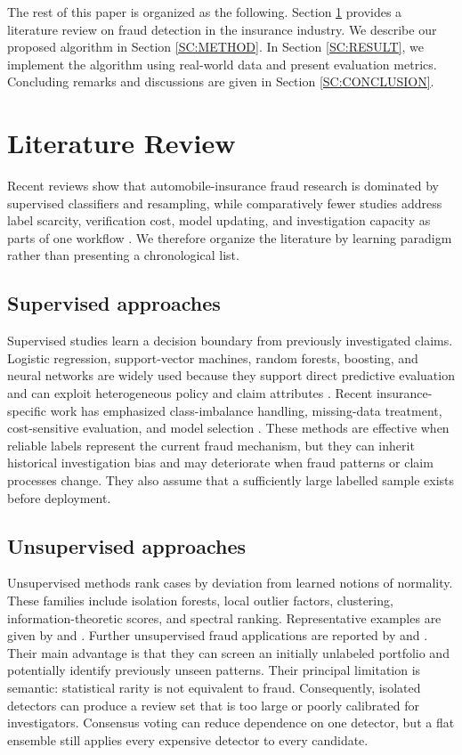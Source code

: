 \documentclass[12pt]{article}
\begin{document}
The rest of this paper is organized as the following. Section
\ref{SC:LR} provides a literature review on fraud detection in the
insurance industry. We describe our proposed algorithm in Section
\ref{SC:METHOD}. In Section \ref{SC:RESULT}, we implement the
algorithm using real-world data and present evaluation metrics.
Concluding remarks and discussions are given in Section
\ref{SC:CONCLUSION}.


\section{Literature Review}\label{SC:LR}

Recent reviews show that automobile-insurance fraud research is dominated by
supervised classifiers and resampling, while comparatively fewer studies
address label scarcity, verification cost, model updating, and investigation
capacity as parts of one workflow \cite{A61,Schrijver2024}. We therefore
organize the literature by learning paradigm rather than presenting a
chronological list.

\subsection{Supervised approaches}
Supervised studies learn a decision boundary from previously investigated
claims. Logistic regression, support-vector machines, random forests, boosting,
and neural networks are widely used because they support direct predictive
evaluation and can exploit heterogeneous policy and claim attributes
\cite{A41,A80}. Recent insurance-specific work has emphasized class-imbalance
handling, missing-data treatment, cost-sensitive evaluation, and model
selection \cite{BanulescuRadu2024,Khalil2024,Ding2025}. These methods are
effective when reliable labels represent the current fraud mechanism, but they
can inherit historical investigation bias and may deteriorate when fraud
patterns or claim processes change. They also assume that a sufficiently large
labelled sample exists before deployment.

\subsection{Unsupervised approaches}
Unsupervised methods rank cases by deviation from learned notions of normality.
These families include isolation forests, local outlier factors, clustering,
information-theoretic scores, and spectral ranking. Representative examples
are given by \cite{A46} and \cite{A57}. Further unsupervised fraud applications
are reported by \cite{Nian2016} and \cite{Gomes2021}. Their main advantage is
that they can screen
an initially unlabeled portfolio and potentially identify previously unseen
patterns. Their principal limitation is semantic: statistical rarity is not
equivalent to fraud. Consequently, isolated detectors can produce a review set
that is too large or poorly calibrated for investigators. Consensus voting can
reduce dependence on one detector, but a flat ensemble still applies every
expensive detector to every candidate.
\end{document}
